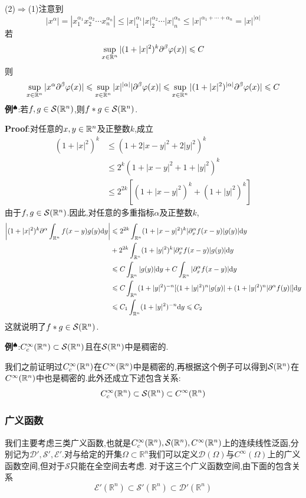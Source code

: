\qquad (2)$\Rightarrow $(1)\quad 注意到
$$
|x^{\alpha}|=|x^{\alpha_1}_{1}x^{\alpha_2}_{2}\cdots x^{\alpha_n}_{n}|\leqslant|x|^{\alpha_1}_{1}|x|^{\alpha_2}_{2}\cdots |x|^{\alpha_n}_{n} \leqslant |x|^{\alpha_1+\cdots+\alpha_n}=|x|^{|\alpha|}
$$
若
$$
\sup_{x\in\mathbb{R}^n}|(1+|x|^2)^k\partial^{\beta}\varphi (x)|\leqslant C
$$
则
$$
\sup_{x\in\mathbb{R}^n}|x^{\alpha}\partial^{\beta}\varphi (x)|\leqslant \sup_{x\in\mathbb{R}^n}|x|^{|\alpha|}|\partial^{\beta}\varphi (x)|\leqslant \sup_{x\in\mathbb{R}^n}|(1+|x|^2)^{|\alpha|}\partial^{\beta}\varphi (x)|\leqslant C
$$
\qquad \textbf{例}$^\spadesuit$:若$f,g\in\mathcal{S}(\mathbb{R}^n)$,则$f*g\in\mathcal{S}(\mathbb{R}^n)$.\par
\textbf{Proof}:对任意的$x,y\in\mathbb{R}^n$及正整数$k$,成立
$$
\begin{aligned}
    (1+|x|^2)^k &\leqslant (1+2|x-y|^2+2|y|^2)^k\\
                &\leqslant 2^k(1+|x-y|^2+1+|y|^2)^k\\
                &\leqslant 2^{2k}[(1+|x-y|^2)^k+(1+|y|^2)^k]
\end{aligned}
$$
由于$f,g\in\mathcal{S}(\mathbb{R}^n)$.因此,对任意的多重指标$\alpha$及正整数$k$,
$$
\begin{aligned}
    \left|(1+|x|^2)^k\partial ^{\alpha}\int_{\mathbb{R}^n}f(x-y)g(y)\mathrm{d} y\right| &\leqslant 2^{2k}\int_{\mathbb{R}^n}(1+|x-y|^2)^k|\partial ^{\alpha}_x f(x-y)|g(y)|\mathrm{d} y\\
                                                           &+2^{2k}\int_{\mathbb{R}^n}(1+|y|^2)^k|\partial ^{\alpha}_x f(x-y)|g(y)|\mathrm{d} y\\
                                                           &\leqslant C\int_{\mathbb{R}^n}|g(y)|\mathrm{d} y+C\int_{\mathbb{R}^n}|\partial ^{\alpha}_x f(x-y)|\mathrm{d} y\\
                                                           &\leqslant C\int_{\mathbb{R}^n}(1+|y|^2)^{-n}[(1+|y|^2)^n|g(y)|+(1+|y|^2)^n|\partial ^{\alpha} f(y)|]\mathrm{d} y\\
                                                           &\leqslant C_1\int_{\mathbb{R}^n}(1+|y|^2)^{-n}\mathrm{d} y\leqslant C_2
\end{aligned}
$$
这就说明了$f*g\in\mathcal{S}(\mathbb{R}^n)$.\par
\qquad \textbf{例}$^\spadesuit$:$C^{\infty}_c(\mathbb{R}^n)\subset\mathcal{S}(\mathbb{R}^n)$且在$\mathcal{S}(\mathbb{R}^n)$中是稠密的.\par
我们之前证明过$C^{\infty}_c(\mathbb{R}^n)$在$C^{\infty}(\mathbb{R} ^n)$中是稠密的,再根据这个例子可以得到$\mathcal{S}(\mathbb{R}^n)$在$C^{\infty}(\mathbb{R}^n)$中也是稠密的.此外还成立下述包含关系:
$$
C^{\infty}_c(\mathbb{R}^n)\subset \mathcal{S}(\mathbb{R}^n)\subset C^{\infty}(\mathbb{R} ^n)
$$
\subsubsection{广义函数}
我们主要考虑三类广义函数,也就是$C^{\infty}_c(\mathbb{R}^n),\mathcal{S}(\mathbb{R}^n),C^{\infty}(\mathbb{R} ^n)$上的连续线性泛函,分别记为$\mathcal{D} ',\mathcal{S} ',\mathcal{E} '$.对与给定的开集$\Omega\subset \mathbb{R}^n$我们可以定义$\mathcal{D}(\Omega)$与$C^{\infty}(\Omega)$上的广义函数空间,但对于$\mathcal{S}$只能在全空间去考虑.
对于这三个广义函数空间,由下面的包含关系
$$
\mathcal{E}'(\mathbb{R}^n)\subset \mathcal{S}'(\mathbb{R}^n)\subset\mathcal{D}'(\mathbb{R}^n)
$$





